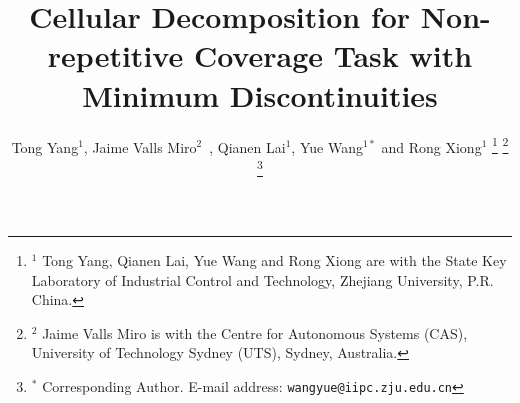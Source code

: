 \documentclass[journal]{IEEEtran}
\begin{document}
%
\title{Cellular Decomposition for Non-repetitive Coverage Task with Minimum Discontinuities}
%
%
%


\author{Tong Yang$^1$, Jaime Valls Miro$^2$~, Qianen Lai$^1$, Yue Wang$^{1*}$ and Rong Xiong$^1$
\thanks{$^1$ Tong Yang, Qianen Lai, Yue Wang and Rong Xiong are with the State Key 
Laboratory of Industrial Control and Technology, Zhejiang University, P.R. China. 
}
\thanks{$^2$ Jaime Valls Miro is with the Centre for Autonomous Systems (CAS), University of Technology Sydney (UTS), Sydney, Australia.}
\thanks{$^*$ Corresponding Author. \newline \indent
E-mail address: {\tt\small wangyue@iipc.zju.edu.cn}}
}

% 
%
\end{document}
